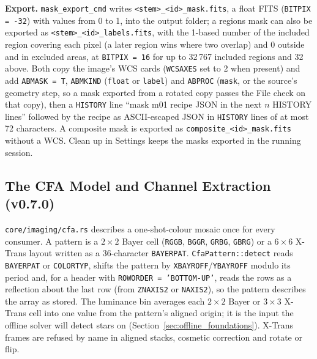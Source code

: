 \documentclass[11pt,a4paper]{article}
\newcommand{\code}[1]{\texttt{\small #1}}
\begin{document}
    \textbf{Export.} \code{mask\_export\_cmd} writes \code{<stem>\_<id>\_mask.fits}, a float FITS (\code{BITPIX = -32}) with values from 0 to 1, into the output folder; a regions mask can also be exported as \code{<stem>\_<id>\_labels.fits}, with the 1-based number of the included region covering each pixel (a later region wins where two overlap) and 0 outside and in excluded areas, at \code{BITPIX = 16} for up to 32\,767 included regions and 32 above. Both copy the image's WCS cards (\code{WCSAXES} set to 2 when present) and add \code{ABMASK = T}, \code{ABMKIND} (\code{float} or \code{label}) and \code{ABPROC} (\code{mask}, or the source's geometry step, so a mask exported from a rotated copy passes the File check on that copy), then a \code{HISTORY} line ``mask m01 recipe JSON in the next $n$ HISTORY lines'' followed by the recipe as ASCII-escaped JSON in \code{HISTORY} lines of at most 72 characters. A composite mask is exported as \code{composite\_<id>\_mask.fits} without a WCS. Clean up in Settings keeps the masks exported in the running session.

    \subsection{The CFA Model and Channel Extraction (v0.7.0)}
    \label{sec:cfa}

    \code{core/imaging/cfa.rs} describes a one-shot-colour mosaic once for every consumer. A pattern is a $2 \times 2$ Bayer cell (\code{RGGB}, \code{BGGR}, \code{GRBG}, \code{GBRG}) or a $6 \times 6$ X-Trans layout written as a 36-character \code{BAYERPAT}. \code{CfaPattern::detect} reads \code{BAYERPAT} or \code{COLORTYP}, shifts the pattern by \code{XBAYROFF}/\code{YBAYROFF} modulo its period and, for a header with \code{ROWORDER = 'BOTTOM-UP'}, reads the rows as a reflection about the last row (from \code{ZNAXIS2} or \code{NAXIS2}), so the pattern describes the array as stored. The luminance bin averages each $2 \times 2$ Bayer or $3 \times 3$ X-Trans cell into one value from the pattern's aligned origin; it is the input the offline solver will detect stars on (Section~\ref{sec:offline_foundations}). X-Trans frames are refused by name in aligned stacks, cosmetic correction and rotate or flip.
\end{document}
